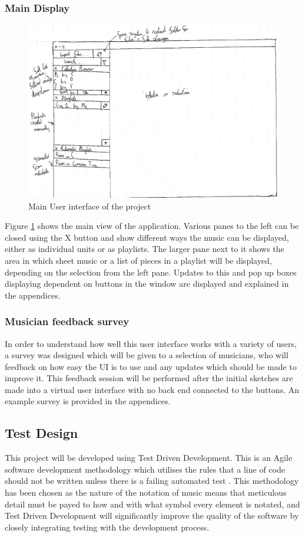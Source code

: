 \subsubsection{Main Display}
\begin{figure}[H]
    \includegraphics[width=400pt]{designs/main}
    \caption{Main User interface of the project}
    \label{fig:main}
\end{figure}
Figure \ref{fig:main} shows the main view of the application. Various panes to the left can be closed using the X button and show different ways the music can be displayed, either as individual units or as playlists. The larger pane next to it shows the area in which sheet music or a list of pieces in a playlist will be displayed, depending on the selection from the left pane. Updates to this and pop up boxes displaying dependent on buttons in the window are displayed and explained in the appendices.
\subsubsection{Musician feedback survey}
In order to understand how well this user interface works with a variety of users, a survey was designed which will be given to a selection of musicians, who will feedback on how easy the UI is to use and any updates which should be made to improve it. This feedback session will be performed after the initial sketches are made into a virtual user interface with no back end connected to the buttons. An example survey is provided in the appendices.
\subsection{Test Design}
This project will be developed using Test Driven Development. This is an Agile software development methodology which utilises the rules that a line of code should not be written unless there is a failing automated test \parencite{TDD}. This methodology has been chosen as the nature of the notation of music means that meticulous detail must be payed to how and with what symbol every element is notated, and Test Driven Development will significantly improve the quality of the software by closely integrating testing with the development process.


